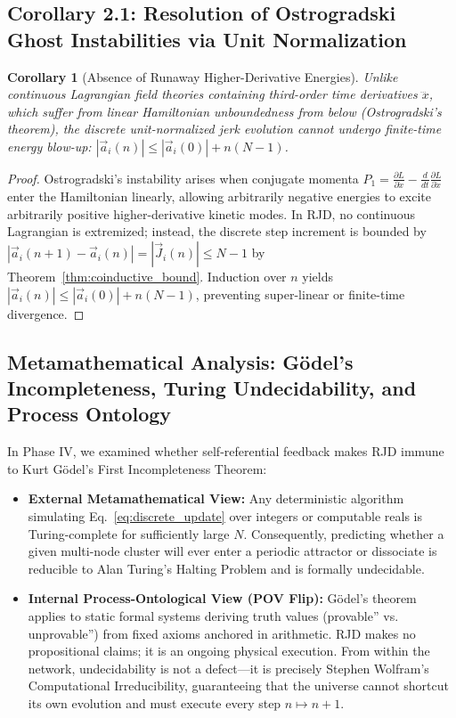 \documentclass[11pt,a4paper]{article}
\theoremstyle{plain}
\newtheorem{corollary}{Corollary}[theorem]
\theoremstyle{definition}
\theoremstyle{remark}
\begin{document}
\subsection{Corollary 2.1: Resolution of Ostrogradski Ghost Instabilities via Unit Normalization}
\begin{corollary}[Absence of Runaway Higher-Derivative Energies]
\label{cor:ostrogradski}
Unlike continuous Lagrangian field theories containing third-order time derivatives $\dddot{x}$, which suffer from linear Hamiltonian unboundedness from below (Ostrogradski's theorem), the discrete unit-normalized jerk evolution cannot undergo finite-time energy blow-up: $|\vec{a}_i(n)| \le |\vec{a}_i(0)| + n(N-1)$.
\end{corollary}
\begin{proof}
Ostrogradski's instability arises when conjugate momenta $P_1 = \frac{\partial L}{\partial \dot{x}} - \frac{d}{dt}\frac{\partial L}{\partial \ddot{x}}$ enter the Hamiltonian linearly, allowing arbitrarily negative energies to excite arbitrarily positive higher-derivative kinetic modes. In RJD, no continuous Lagrangian is extremized; instead, the discrete step increment is bounded by $|\vec{a}_i(n+1) - \vec{a}_i(n)| = |\vec{J}_i(n)| \le N - 1$ by Theorem~\ref{thm:coinductive_bound}. Induction over $n$ yields $|\vec{a}_i(n)| \le |\vec{a}_i(0)| + n(N-1)$, preventing super-linear or finite-time divergence.
\end{proof}
\subsection{Metamathematical Analysis: Gödel's Incompleteness, Turing Undecidability, and Process Ontology}
In Phase IV, we examined whether self-referential feedback makes RJD immune to Kurt Gödel's First Incompleteness Theorem:
\begin{itemize}
\item \textbf{External Metamathematical View:} Any deterministic algorithm simulating Eq.~\eqref{eq:discrete_update} over integers or computable reals is Turing-complete for sufficiently large $N$. Consequently, predicting whether a given multi-node cluster will ever enter a periodic attractor or dissociate is reducible to Alan Turing's Halting Problem and is formally undecidable.
\item \textbf{Internal Process-Ontological View (POV Flip):} Gödel's theorem applies to static formal systems deriving truth values (provable'' vs. unprovable'') from fixed axioms anchored in arithmetic. RJD makes no propositional claims; it is an ongoing physical execution. From within the network, undecidability is not a defect---it is precisely Stephen Wolfram's Computational Irreducibility, guaranteeing that the universe cannot shortcut its own evolution and must execute every step $n \mapsto n+1$.
\end{itemize}
\end{document}
